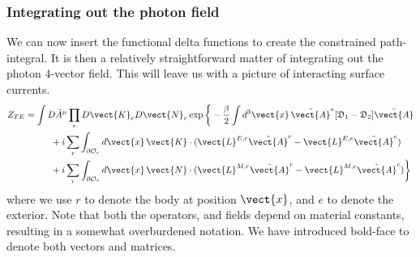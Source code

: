 \subsubsection{Integrating out the photon field}

We can now insert the functional delta functions to create the constrained path-integral.  
It is then a relatively straightforward matter of integrating out the photon 4-vector field.  
This will leave us with a picture of interacting surface currents.  
\begin{align}
  Z_{TE} &= \int D\tilde{A}^\mu \prod_rD\vect{K}_rD\vect{N}_r\exp\bigg\{-\frac{\beta}{2}\int d^3\vect{x}\,
    \tilde{\vect{A}}^{*} [\mathfrak{D}_1 -\mathfrak{D}_2]\tilde{\vect{A}}\nonumber\\
    &\hspace{1cm}  +i\sum_{r} \int_{\partial\mathcal{O}_r}d\vect{x}\,\vect{K}\cdot(
    \vect{L}^{E,r}\tilde{\vect{A}}^{r}-\vect{L}^{E,e}\tilde{\vect{A}}^e)\nonumber\\
    &\hspace{1cm}  +i\sum_{r} \int_{\partial\mathcal{O}_r}d\vect{x}\,\vect{N}\cdot(
    \vect{L}^{M,r}\tilde{\vect{A}}^{r}-\vect{L}^{M,e}\tilde{\vect{A}}^e)\bigg\}
\end{align}
where we use $r$ to denote the body at position $\vect{x}$, and $e$ to denote the exterior.
Note that both the operators, and fields depend on material constants, resulting in a somewhat
overburdened notation.  We have introduced bold-face to denote both vectors and matrices.

